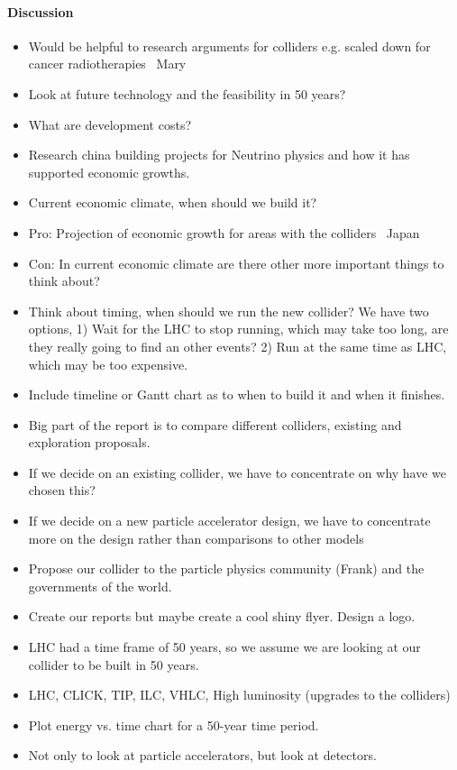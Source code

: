 \paragraph{Discussion}
\begin{itemize}
 \item Would be helpful to research arguments for colliders e.g. scaled down for cancer radiotherapies  \textemdash \, Mary
 \item Look at future technology and the feasibility in 50 years?
 \item What are development costs?
 \item Research china building projects for Neutrino physics and how it has supported economic growths.
 \item Current economic climate, when should we build it?
 \item Pro: Projection of economic growth for areas with the colliders  \textemdash \, Japan
 \item Con: In current economic climate are there other more important things to think about?
 \item Think about timing, when should we run the new collider? We have two options, 1) Wait for the LHC to stop running, which may take too long, are they really going to find an other events? 2) Run at the same time as LHC, which may be too expensive.
 \item Include timeline or Gantt chart as to when to build it and when it finishes.
 \item Big part of the report is to compare different colliders, existing and exploration proposals.
 \item If we decide on an existing collider, we have to concentrate on why have we chosen this?
 \item If we decide on a new particle accelerator design, we have to concentrate more on the design rather than comparisons to other models
 \item Propose our collider to the particle physics community (Frank) and the governments of the world.
 \item Create our reports but maybe create a cool shiny flyer. Design a logo.
 \item LHC had a time frame of 50 years, so we assume we are looking at our collider to be built in 50 years.
 \item LHC, CLICK, TIP, ILC, VHLC, High luminosity (upgrades to the colliders)
 \item Plot energy vs. time chart for a 50-year time period.
 \item Not only to look at particle accelerators, but look at detectors.
\end{itemize}

